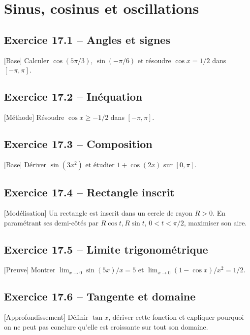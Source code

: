 \chapter{Sinus, cosinus et oscillations}
\section*{Exercice 17.1 -- Angles et signes}
[Base] Calculer $\cos(5\pi/3)$, $\sin(-\pi/6)$ et résoudre $\cos x=1/2$ dans $[-\pi,\pi]$.

\section*{Exercice 17.2 -- Inéquation}
[Méthode] Résoudre $\cos x\ge-1/2$ dans $[-\pi,\pi]$.

\section*{Exercice 17.3 -- Composition}
[Base] Dériver $\sin(3x^2)$ et étudier $1+\cos(2x)$ sur $[0,\pi]$.

\section*{Exercice 17.4 -- Rectangle inscrit}
[Modélisation] Un rectangle est inscrit dans un cercle de rayon $R>0$. En paramétrant ses demi-côtés par $R\cos t,R\sin t$, $0<t<\pi/2$, maximiser son aire.

\section*{Exercice 17.5 -- Limite trigonométrique}
[Preuve] Montrer $\lim_{x\to0}\sin(5x)/x=5$ et $\lim_{x\to0}(1-\cos x)/x^2=1/2$.

\section*{Exercice 17.6 -- Tangente et domaine}
[Approfondissement] Définir $\tan x$, dériver cette fonction et expliquer pourquoi on ne peut pas conclure qu'elle est croissante sur tout son domaine.
